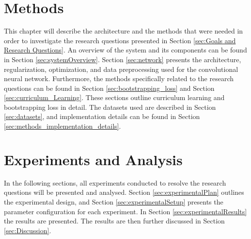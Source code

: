 \documentclass[a4paper]{book}
\begin{document}
\chapter{Methods}
\label{cha:architectureAndModel}
This chapter will describe the architecture and the methods that were needed in order to investigate the research questions presented in Section \ref{sec:Goals and Research Questions}. An overview of the system and its components can be found in Section \ref{sec:systemOverview}. Section \ref{sec:network} presents the architecture, regularization, optimization, and data preprocessing used for the convolutional neural network. Furthermore, the methods specifically related to the research questions can be found in Section \ref{sec:bootstrapping_loss} and Section \ref{sec:curriculum_Learning}. These sections outline curriculum learning and bootstrapping loss in detail. The datasets used are described in Section \ref{sec:datasets}, and implementation details can be found in Section \ref{sec:methods_implementation_details}.














\chapter{Experiments and Analysis}
In the following sections, all experiments conducted to resolve the research questions will be presented and analysed. Section \ref{sec:experimentalPlan} outlines the experimental design, and Section \ref{sec:experimentalSetup} presents the parameter configuration for each experiment. In Section \ref{sec:experimentalResults} the results are presented. The results are then further discussed in Section \ref{sec:Discussion}.
\label{cha:ResearchAndResults}








\end{document}
